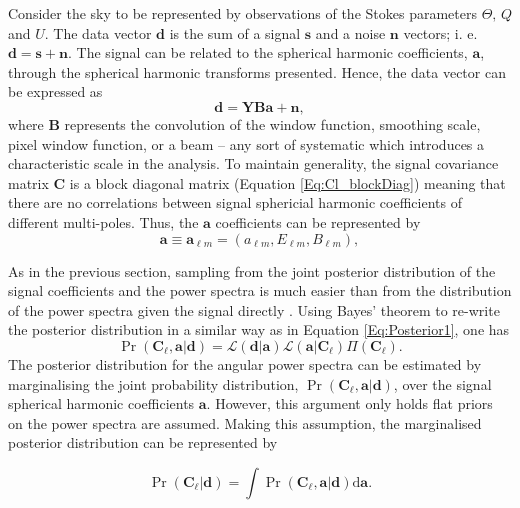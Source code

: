 \qquad Consider the sky to be represented by observations of the Stokes parameters $\Theta,\, Q$ and $U$. The data vector $\mathbf{d}$ is the sum of a signal $\mathbf{s}$ and a noise $\mathbf{n}$ vectors; i. e. $\mathbf{d}=\mathbf{s}+\mathbf{n}$.  The signal can be related to the spherical harmonic coefficients, $\mathbf{a}$, through the spherical harmonic transforms presented. Hence, the data vector can be expressed as
\begin{equation}
\mathbf{d}=\mathbf{YBa}+\mathbf{n},
\end{equation}
\noindent where $\mathbf{B}$ represents the convolution of the window function, smoothing scale, pixel window function, or a beam -- any sort of systematic which introduces a characteristic scale in the analysis. To maintain generality, the signal covariance matrix $\mathbf{C}$ is a block diagonal matrix (Equation \ref{Eq:Cl_blockDiag}) meaning that there are no correlations between signal sphericial harmonic coefficients of different multi-poles. Thus, the $\bm{a}$ coefficients can be represented by
\begin{equation}
\mathbf{a} \equiv \mathbf{a}_{\ell m}=\left( a_{\ell m},E_{\ell m},B_{\ell m}\right),
\end{equation}

\qquad As in the previous section, sampling from the joint posterior distribution of the signal coefficients and the power spectra is much easier than from the distribution of the power spectra given the signal directly \citep{Wandelt2004,Larson2007,AlmostBlackPearl2016}. Using Bayes' theorem to re-write the posterior distribution in a similar way as in Equation \ref{Eq:Posterior1}, one has
\begin{equation}
\Pr(\mathbf{C}_{\ell},\mathbf{a}|\mathbf{d})=\mathcal{L}(\mathbf{d}|\mathbf{a})\mathcal{L}(\mathbf{a}|\mathbf{C}_{\ell})\Pi(\mathbf{C}_{\ell}).
\label{Eq:FullPost}
\end{equation}
The posterior distribution for the angular power spectra can be estimated by marginalising the joint probability distribution, $\Pr(\mathbf{C}_{\ell },\mathbf{a}|\mathbf{d})$, over the signal spherical harmonic coefficients $\mathbf{a}$. However, this argument only holds flat priors on the power spectra are assumed. Making this assumption, the marginalised posterior distribution can be represented by

\begin{equation}
\Pr(\mathbf{C}_{\ell}|\mathbf{d}) = \int \Pr(\mathbf{C}_{\ell},\mathbf{a}|\mathbf{d}) \text{d}\mathbf{a} .
\end{equation}


